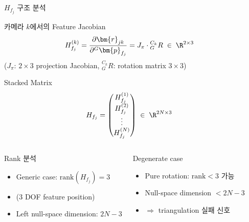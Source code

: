 \begin{frame}[shrink=10]{$H_{f_j}$ 구조 분석}
  \begin{block}{카메라 $k$에서의 Feature Jacobian}
    \begin{align*}
      H_{f_j}^{(k)} &= \frac{\partial \bm{r}_{jk}}{\partial {}^G\bm{p}_{f_j}}
      = J_\pi \cdot {}^{C_k}_G R \;\in\; \R^{2\times 3}
    \end{align*}
    ($J_\pi$: $2\times3$ projection Jacobian, ${}^{C_k}_G R$: rotation matrix $3\times3$)
  \end{block}
  \begin{block}{Stacked Matrix}
    \begin{align*}
      H_{f_j} &= \begin{pmatrix} H_{f_j}^{(1)} \\ H_{f_j}^{(2)} \\ \vdots \\ H_{f_j}^{(N)} \end{pmatrix}
      \;\in\; \R^{2N\times 3}
    \end{align*}
  \end{block}
  \begin{columns}[T]
      \begin{exampleblock}{Rank 분석}
        \begin{itemize}
          \item Generic case: $\text{rank}(H_{f_j}) = 3$
          \item (3 DOF feature position)
          \item Left null-space dimension: $2N - 3$
        \end{itemize}
      \end{exampleblock}
      \begin{alertblock}{Degenerate case}
        \begin{itemize}
          \item Pure rotation: $\text{rank} < 3$ 가능
          \item Null-space dimension $< 2N-3$
          \item $\Rightarrow$ triangulation 실패 신호
        \end{itemize}
      \end{alertblock}
  \end{columns}
\end{frame}

